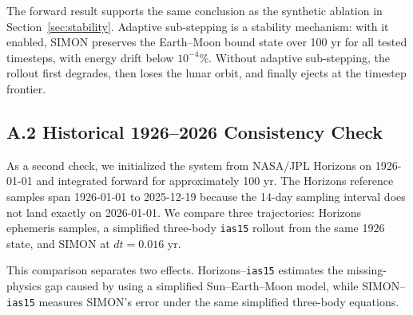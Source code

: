 \documentclass[12pt]{article}
\begin{document}
The forward result supports the same conclusion as the synthetic ablation in
Section~\ref{sec:stability}. Adaptive sub-stepping is a stability mechanism: with it
enabled, SIMON preserves the Earth--Moon bound state over 100 yr for all tested
timesteps, with energy drift below \(10^{-4}\%\). Without adaptive sub-stepping, the
rollout first degrades, then loses the lunar orbit, and finally ejects at the timestep
frontier.

\subsection*{A.2 Historical 1926--2026 Consistency Check}

As a second check, we initialized the system from NASA/JPL Horizons on 1926-01-01 and
integrated forward for approximately 100 yr. The Horizons reference samples span
1926-01-01 to 2025-12-19 because the 14-day sampling interval does not land exactly on
2026-01-01. We compare three trajectories: Horizons ephemeris samples, a simplified
three-body \texttt{ias15} rollout from the same 1926 state, and SIMON at \(dt=0.016\) yr.

This comparison separates two effects. Horizons--\texttt{ias15} estimates the
missing-physics gap caused by using a simplified Sun--Earth--Moon model, while
SIMON--\texttt{ias15} measures SIMON's error under the same simplified three-body
equations.

\begin{table}[H]
\centering
\caption{Historical Sun--Earth--Moon validation over approximately 100 yr.}
\label{tab:real_sem_historical}
\scriptsize
\setlength{\tabcolsep}{4pt}
\renewcommand{\arraystretch}{1.12}
\end{table}
\end{document}
